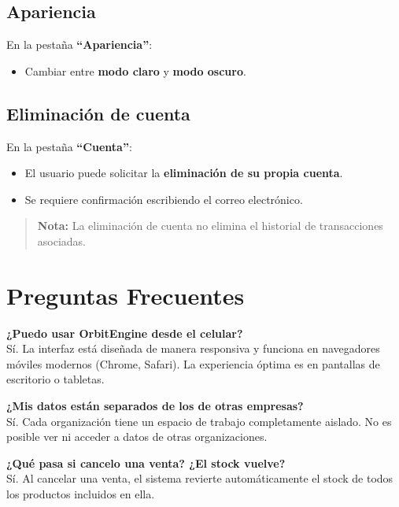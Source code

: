 \subsection{Apariencia}\label{apariencia}

En la pestaña \textbf{``Apariencia''}:

\begin{itemize}
\tightlist
\item
  Cambiar entre \textbf{modo claro} y \textbf{modo oscuro}.
\end{itemize}

\subsection{Eliminación de cuenta}\label{eliminaciuxf3n-de-cuenta}

En la pestaña \textbf{``Cuenta''}:

\begin{itemize}
\tightlist
\item
  El usuario puede solicitar la \textbf{eliminación de su propia cuenta}.
\item
  Se requiere confirmación escribiendo el correo electrónico.
\end{itemize}

\begin{quote}
\textbf{Nota:} La eliminación de cuenta no elimina el historial de transacciones asociadas.
\end{quote}

\section{Preguntas Frecuentes}\label{preguntas-frecuentes}

\textbf{¿Puedo usar OrbitEngine desde el celular?}\\
Sí. La interfaz está diseñada de manera responsiva y funciona en navegadores móviles modernos (Chrome, Safari). La experiencia óptima es en pantallas de escritorio o tabletas.

\textbf{¿Mis datos están separados de los de otras empresas?}\\
Sí. Cada organización tiene un espacio de trabajo completamente aislado. No es posible ver ni acceder a datos de otras organizaciones.

\textbf{¿Qué pasa si cancelo una venta? ¿El stock vuelve?}\\
Sí. Al cancelar una venta, el sistema revierte automáticamente el stock de todos los productos incluidos en ella.

